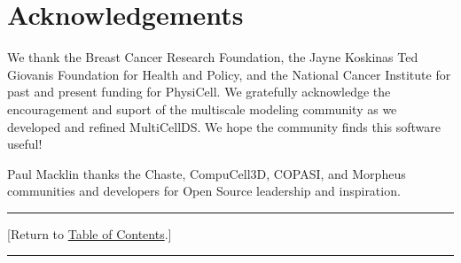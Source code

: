 \documentclass[12pt]{article}
\renewcommand{\v}{\verb}
\newcommand{\red}[1]{\textcolor{red}{#1}}
\newcommand{\FIX}{}%
\newcommand{\TOClink}{\begin{center}\hrule\vskip-5pt\phantom{.}\hfill[Return to \hyperlink{TOC}{Table of Contents}.]\hfill\phantom{.}\vskip3pt\hrule\end{center}}
\begin{document}










\section{Acknowledgements}
We thank the Breast Cancer Research Foundation, the 
Jayne Koskinas Ted Giovanis Foundation for Health and Policy, and 
the National Cancer Institute for past and present funding for 
PhysiCell. We gratefully acknowledge the encouragement and 
suport of the multiscale modeling community as we 
developed and refined MultiCellDS. We hope the community 
finds this software useful! 

Paul Macklin thanks the Chaste, CompuCell3D, COPASI, and Morpheus communities and 
developers for Open Source leadership and inspiration. 
\TOClink



\end{document}
